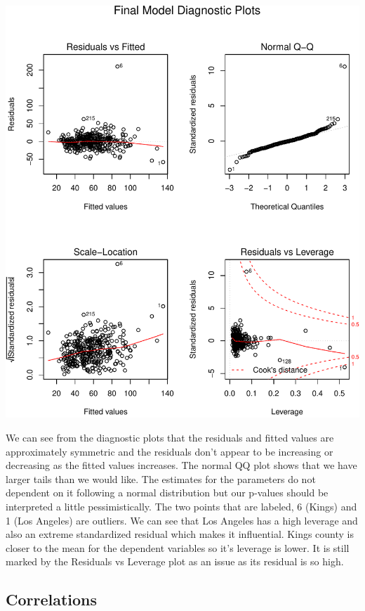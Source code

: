 \documentclass[]{article}
\begin{document}
\includegraphics{project_files/figure-latex/unnamed-chunk-23-1.pdf}

We can see from the diagnostic plots that the residuals and fitted
values are approximately symmetric and the residuals don't appear to be
increasing or decreasing as the fitted values increases. The normal QQ
plot shows that we have larger tails than we would like. The estimates
for the parameters do not dependent on it following a normal
distribution but our p-values should be interpreted a little
pessimistically. The two points that are labeled, 6 (Kings) and 1 (Los
Angeles) are outliers. We can see that Los Angeles has a high leverage
and also an extreme standardized residual which makes it influential.
Kings county is closer to the mean for the dependent variables so it's
leverage is lower. It is still marked by the Residuals vs Leverage plot
as an issue as its residual is so high.

\subsection{Correlations}\label{correlations}
\end{document}
